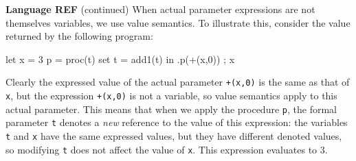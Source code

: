 \begin{minipage}[t]{\sw}
\slidenumber
\LARGE
{\bf Language REF} (continued)\exx
When actual parameter expressions are not themselves variables,
we use value semantics.
To illustrate this, consider the value returned by the following program:
\begin{qv}
let
  x = 3
  p = proc(t) set t = add1(t)
in
  { .p(+(x,0)) ; x }
\end{qv}
Clearly the expressed value
of the actual parameter \verb'+(x,0)'
is the same as that of \verb'x',
but the expression \verb'+(x,0)' is not a variable,
so value semantics apply to this actual parameter.
This means that when we apply the procedure \verb'p',
the formal parameter \verb't' denotes
a {\em new} reference to the value of this expression:
the variables \verb't' and \verb'x' have the same expressed values,
but they have different denoted values,
so modifying \verb't' does not affect the value of \verb'x'.
This expression evaluates to 3.
\end{minipage}
\clearpage
